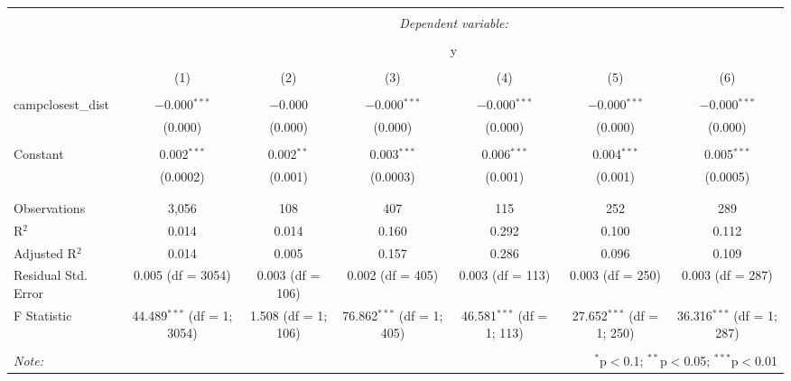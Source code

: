 
\begin{table}[!htbp] \centering 
  \caption{} 
  \label{} 
\begin{tabular}{@{\extracolsep{5pt}}lcccccc} 
\\[-1.8ex]\hline 
\hline \\[-1.8ex] 
 & \multicolumn{6}{c}{\textit{Dependent variable:}} \\ 
\cline{2-7} 
\\[-1.8ex] & \multicolumn{6}{c}{y} \\ 
\\[-1.8ex] & (1) & (2) & (3) & (4) & (5) & (6)\\ 
\hline \\[-1.8ex] 
 campclosest\_dist & $-$0.000$^{***}$ & $-$0.000 & $-$0.000$^{***}$ & $-$0.000$^{***}$ & $-$0.000$^{***}$ & $-$0.000$^{***}$ \\ 
  & (0.000) & (0.000) & (0.000) & (0.000) & (0.000) & (0.000) \\ 
  & & & & & & \\ 
 Constant & 0.002$^{***}$ & 0.002$^{**}$ & 0.003$^{***}$ & 0.006$^{***}$ & 0.004$^{***}$ & 0.005$^{***}$ \\ 
  & (0.0002) & (0.001) & (0.0003) & (0.001) & (0.001) & (0.0005) \\ 
  & & & & & & \\ 
\hline \\[-1.8ex] 
Observations & 3,056 & 108 & 407 & 115 & 252 & 289 \\ 
R$^{2}$ & 0.014 & 0.014 & 0.160 & 0.292 & 0.100 & 0.112 \\ 
Adjusted R$^{2}$ & 0.014 & 0.005 & 0.157 & 0.286 & 0.096 & 0.109 \\ 
Residual Std. Error & 0.005 (df = 3054) & 0.003 (df = 106) & 0.002 (df = 405) & 0.003 (df = 113) & 0.003 (df = 250) & 0.003 (df = 287) \\ 
F Statistic & 44.489$^{***}$ (df = 1; 3054) & 1.508 (df = 1; 106) & 76.862$^{***}$ (df = 1; 405) & 46.581$^{***}$ (df = 1; 113) & 27.652$^{***}$ (df = 1; 250) & 36.316$^{***}$ (df = 1; 287) \\ 
\hline 
\hline \\[-1.8ex] 
\textit{Note:}  & \multicolumn{6}{r}{$^{*}$p$<$0.1; $^{**}$p$<$0.05; $^{***}$p$<$0.01} \\ 
\end{tabular} 
\end{table} 
